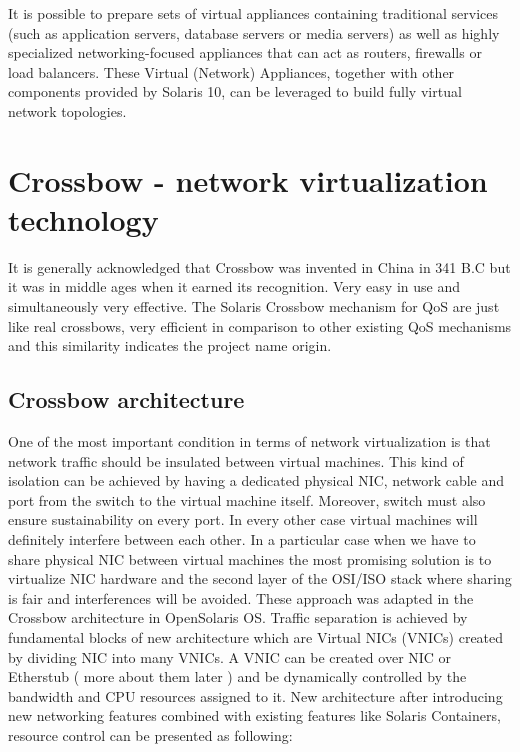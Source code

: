 \documentclass[11pt]{book}
\begin{document}
        It is possible to prepare sets of virtual appliances containing traditional services (such as application
        servers, database servers or media servers) as well as highly specialized networking-focused appliances that can
        act as routers, firewalls or load balancers. These Virtual (Network) Appliances, together with other components
        provided by Solaris 10,  can be leveraged to build fully virtual network topologies.


    \section{Crossbow - network virtualization technology}


                It is generally acknowledged that Crossbow was invented in China in 341 B.C but it was in middle ages when 
                it earned its recognition. Very easy in use and simultaneously very effective. The Solaris Crossbow mechanism 
                for QoS are just like real crossbows, very efficient in comparison to other existing QoS mechanisms and this
                similarity indicates the project name origin.

                \subsection{Crossbow architecture}

                One of the most important condition in terms of network virtualization is that network traffic
              should be insulated between virtual machines. This kind of isolation can be achieved by having
              a dedicated physical NIC, network cable and port from the switch to the virtual machine
              itself. Moreover, switch must also ensure sustainability on every port. In every other case
              virtual machines will definitely interfere between each other.
                In a particular case when we have to share physical NIC between virtual machines the most promising solution is to
              virtualize NIC hardware and the second layer of the OSI/ISO stack where sharing is fair and
              interferences will be avoided. These approach was adapted in the Crossbow architecture in
              OpenSolaris OS.
                Traffic separation is achieved by fundamental blocks of new architecture
              which are Virtual NICs (VNICs) created by dividing NIC into many VNICs. 
                A VNIC can be created over NIC or Etherstub ( more about them later ) and be dynamically controlled by the
              bandwidth and CPU resources assigned to it. New architecture after introducing new networking features combined with existing features
              like Solaris Containers, resource control can be presented as following:
\end{document}
